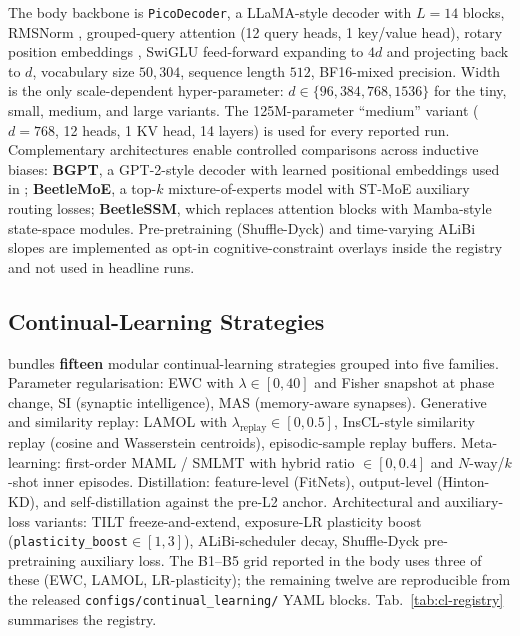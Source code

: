 The body backbone is \texttt{PicoDecoder}, a LLaMA-style \citep{touvron2023llama} decoder with $L=14$ blocks, RMSNorm \citep{zhang2019rms}, grouped-query attention \citep{ainslie2023gqa} (12 query heads, 1 key/value head), rotary position embeddings \citep{su2024rope}, SwiGLU feed-forward \citep{shazeer2020glu} expanding to $4d$ and projecting back to $d$, vocabulary size $50{,}304$, sequence length $512$, BF16-mixed precision. Width is the only scale-dependent hyper-parameter: $d\in\{96,384,768,1536\}$ for the tiny, small, medium, and large variants. The 125M-parameter ``medium'' variant ($d=768$, 12 heads, 1 KV head, 14 layers) is used for every reported run. Complementary architectures enable controlled comparisons across inductive biases: \textbf{BGPT}, a GPT-2-style decoder with learned positional embeddings used in \citet{arnett-etal-2025-acquisition}; \textbf{BeetleMoE}, a top-$k$ mixture-of-experts model with ST-MoE auxiliary routing losses; \textbf{BeetleSSM}, which replaces attention blocks with Mamba-style state-space modules. Pre-pretraining (Shuffle-Dyck) and time-varying ALiBi slopes are implemented as opt-in cognitive-constraint overlays inside the registry and not used in headline runs.

\subsection{Continual-Learning Strategies}\label{sec:cl-strategies}

\beetle{} bundles \textbf{fifteen} modular continual-learning strategies grouped into five families. Parameter regularisation: EWC \citep{kirkpatrick2017overcoming} with $\lambda\in[0,40]$ and Fisher snapshot at phase change, SI (synaptic intelligence), MAS (memory-aware synapses). Generative and similarity replay: LAMOL \citep{sun2020lamol} with $\lambda_{\text{replay}}\in[0,0.5]$, InsCL-style similarity replay (cosine and Wasserstein centroids), episodic-sample replay buffers. Meta-learning: first-order MAML / SMLMT \citep{bansal-etal-2020-self,africa-etal-2025-learning,africa-etal-2025-meta} with hybrid ratio $\in[0,0.4]$ and $N$-way/$k$-shot inner episodes. Distillation: feature-level (FitNets), output-level (Hinton-KD), and self-distillation against the pre-L2 anchor. Architectural and auxiliary-loss variants: TILT freeze-and-extend, exposure-LR plasticity boost (\texttt{plasticity\_boost}$\in[1,3]$), ALiBi-scheduler decay, Shuffle-Dyck pre-pretraining auxiliary loss. The B1--B5 grid reported in the body uses three of these (EWC, LAMOL, LR-plasticity); the remaining twelve are reproducible from the released \texttt{configs/continual\_learning/} YAML blocks. Tab.~\ref{tab:cl-registry} summarises the registry.

